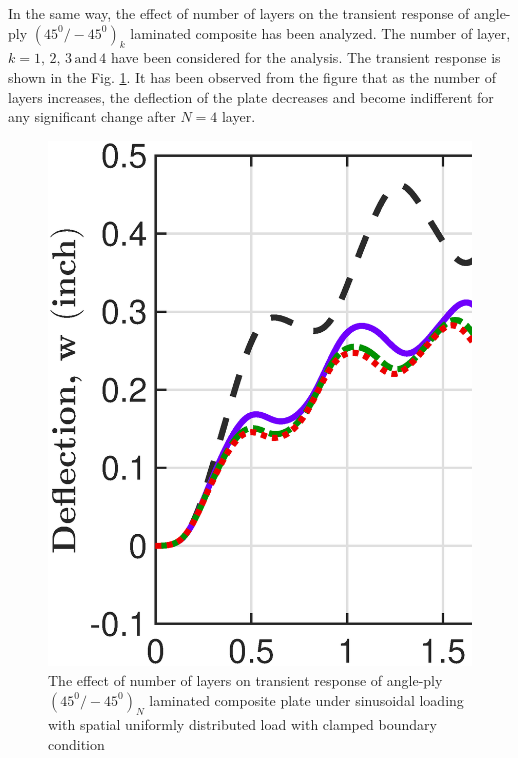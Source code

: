 \documentclass[3p,preprint,12pt]{elsarticle}
\begin{document}
In the same way, the effect of number of layers on the transient response of angle-ply $(45^{0}/-45^{0})_{k}$ laminated composite has been analyzed. The number of layer, $k=1,\,2,\,3\,\text{and}\,4$ have been considered for the
analysis. The transient response is shown in the Fig. \ref{tran_NOL_study}. It has been observed from the figure that as the number of layers increases, the deflection of the plate decreases and become indifferent for any significant change after $N=4$ layer.

\begin{figure}
	\begin{centering}
		\graphicspath{{./All_Images/}}
		\includegraphics[scale=0.3]{Number_Layered_Angle_Ply.eps}
		\par\end{centering}
	\caption{The effect of number of layers on transient response of angle-ply
		$(45^{0}/-45^{0})_{N}$ laminated composite plate under sinusoidal loading with spatial uniformly distributed load with clamped boundary condition}
	\label{tran_NOL_study}
\end{figure}
\end{document}

